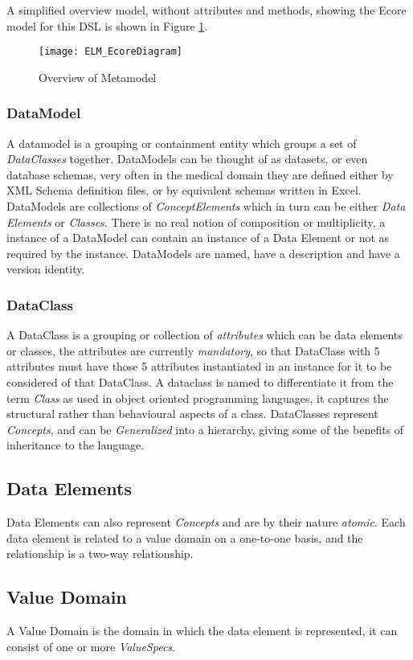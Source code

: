A simplified overview model, without attributes and methods, showing the Ecore model for this DSL is shown in Figure \ref{fig:mcSimplifiedOverview}.
\begin{figure}[here]
	\texttt{[image: ELM\_EcoreDiagram]}
	\caption{Overview of Metamodel} 
	\label{fig:mcSimplifiedOverview}
\end{figure}

\subsubsection{DataModel}
A datamodel is a grouping or containment entity which groups a set of \emph{DataClasses} together. DataModels can be thought of as datasets, or even database schemas, very often in the medical domain they are defined either by XML Schema definition files, or by equivalent schemas written in Excel. 
DataModels are collections of \emph{ConceptElements} which in turn can be either \emph{Data Elements} or \emph{Classes}. There is no real notion of composition or multiplicity, a instance of a DataModel can contain an instance of a Data Element or not as required by the instance.  DataModels are named, have a description and have a version identity.
\subsubsection{DataClass}
A DataClass is a grouping or collection of \emph{attributes} which can be data elements or classes, the attributes are currently \emph{mandatory}, so that DataClass with 5 attributes must have those 5 attributes instantiated in an instance for it to be considered of that DataClass. A dataclass is named to differentiate it from the term \emph{Class} as used in object oriented programming languages, it captures the structural rather than behavioural aspects of a class.  DataClasses represent \emph{Concepts}, and can be \emph{Generalized} into a hierarchy, giving some of the benefits of inheritance to the language.  
\subsection{Data Elements} 
Data Elements can also represent \emph{Concepts} and are by their nature \emph{atomic}.  Each data element is related to a value domain on a one-to-one basis, and the relationship is a two-way relationship.
\subsection{Value Domain}
A Value Domain is the domain in which the data element is represented, it can consist of one or more \emph{ValueSpecs}.
